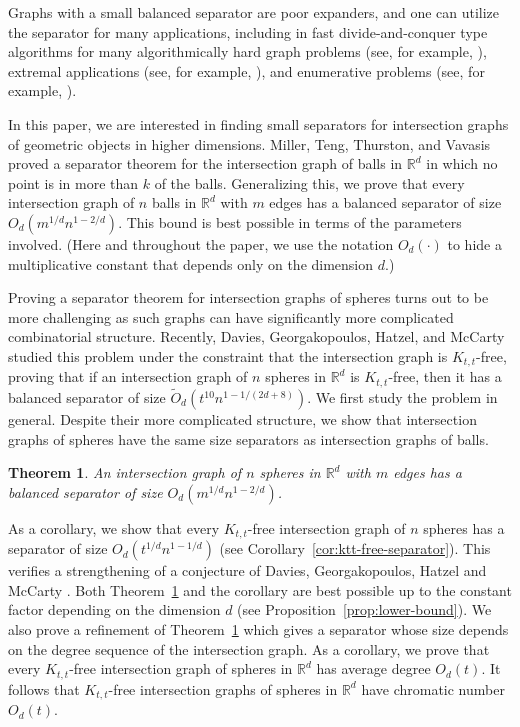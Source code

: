 \documentclass[11pt, reqno]{amsart}
\theoremstyle{plain}
\newtheorem{theorem}{Theorem}
\theoremstyle{definition}
\theoremstyle{remark}
\numberwithin{theorem}{section}
\numberwithin{equation}{section}
\newcommand{\R}{\mathbb R}
\begin{document}
Graphs with a small balanced separator are poor expanders, and one can utilize the separator for many applications, including in fast divide-and-conquer type algorithms for many algorithmically hard graph problems (see, for example, \cite{LT80}), extremal applications (see, for example, \cite{FP14,LRT79}), and enumerative problems (see, for example, \cite{DN10}). 

In this paper, we are interested in finding small separators for intersection graphs of geometric objects in higher dimensions. Miller, Teng, Thurston, and Vavasis \cite{MTTV97} proved a separator theorem for the intersection graph of balls in  $\R^d$ in which no point is in more than $k$ of the balls. Generalizing this, we prove that every intersection graph of $n$ balls in $\R^d$ with $m$ edges has a balanced separator of size $O_d(m^{1/d}n^{1-2/d})$. This bound is best possible in terms of the parameters involved. (Here and throughout the paper, we use the notation $O_d(\cdot)$ to hide a multiplicative constant that depends only on the dimension $d$.)

Proving a separator theorem for intersection graphs of spheres turns out to be more challenging as such graphs can have significantly more complicated combinatorial structure. Recently, Davies, Georgakopoulos, Hatzel, and McCarty \cite{DGHM25} studied this problem under the constraint that the intersection graph is $K_{t,t}$-free, proving that if an intersection graph of $n$ spheres in $\R^d$ is $K_{t,t}$-free, then it has a balanced separator of size $\tilde{O}_d(t^{10}n^{1-1/(2d+8)})$. We first study the problem in general. Despite their more complicated structure, we show that intersection graphs of spheres have the same size separators as intersection graphs of balls.

\begin{theorem}
\label{thm:sphere-separator-main-intro}
An intersection graph of $n$ spheres in $\R^d$ with $m$ edges has a balanced separator of size $O_{d}(m^{1/d}n^{1-2/d})$.
\end{theorem}

As a corollary, we show that every $K_{t,t}$-free intersection graph of $n$ spheres has a separator of size $O_d(t^{1/d}n^{1-1/d})$ (see Corollary~\ref{cor:ktt-free-separator}). This verifies a strengthening of a conjecture of Davies, Georgakopoulos, Hatzel and McCarty \cite[Conjecture 20]{DGHM25}. Both Theorem~\ref{thm:sphere-separator-main-intro} and the corollary are best possible up to the constant factor depending on the dimension $d$ (see Proposition~\ref{prop:lower-bound}). We also prove a refinement of Theorem~\ref{thm:sphere-separator-main-intro} which gives a separator whose size depends on the degree sequence of the intersection graph. As a corollary, we prove that every $K_{t,t}$-free intersection graph of spheres in $\R^d$ has average degree $O_d(t)$. It follows that $K_{t,t}$-free intersection graphs of spheres in $\R^d$ have chromatic number $O_d(t)$. 
\end{document}
